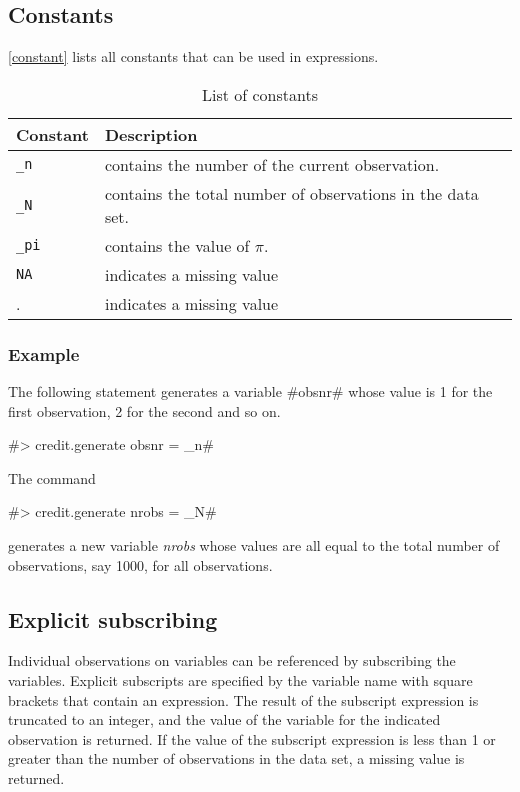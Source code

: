 \subsection{Constants}
 
 \index{$\pi$} 

\autoref{constant} lists all constants that can be used in
expressions.


\begin{table}[ht]
\begin{center}
\begin{tabular}{|l|l|}
\hline
Constant & Description \\
\hline \hline
\texttt{\_n} & contains the number of the current observation.  \\
\texttt{\_N }& contains the total number of observations in the data set. \\
\texttt{\_pi} & contains the value of $\pi$. \\
\texttt{NA} & indicates a missing value \\
.  & indicates a missing value \\

\hline
\end{tabular}
{\em \caption{\label{constant} List of constants}}
\end{center}
\end{table}


\subsubsection*{Example}

The following statement generates a variable #obsnr# whose value
is 1 for the first observation, 2 for the second and so on.

#> credit.generate obsnr = _n#

The command

#> credit.generate nrobs = _N#

generates a new variable {\em nrobs} whose values are all equal to
the total number of observations, say 1000, for all observations.

\subsection{Explicit subscribing}
 

Individual observations on variables can be referenced by
subscribing the variables. Explicit subscripts are specified by
the variable name with square brackets that contain an expression.
The result of the subscript expression is truncated to an integer,
and the value of the variable for the indicated observation is
returned. If  the value of the subscript expression is less than 1
or greater than the number of observations in the data set,
a missing value is returned.

